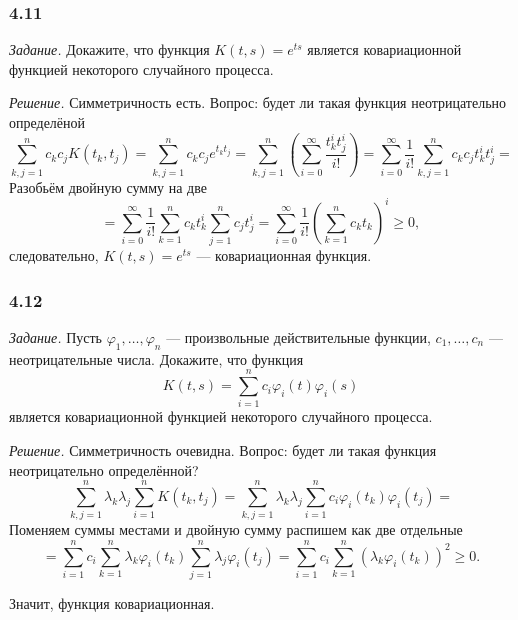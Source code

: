 \subsubsection*{4.11}

\textit{Задание.}
Докажите, что функция $K \left( t, s \right) = e^{ts}$
является ковариационной функцией некоторого случайного процесса.

\textit{Решение.}
Симметричность есть.
Вопрос: будет ли такая функция неотрицательно определёной
$$ \sum \limits_{k, j = 1}^n c_k c_j K \left( t_k, t_j \right) =
  \sum \limits_{k, j = 1}^n c_k c_j e^{t_k t_j} =
  \sum \limits_{k, j = 1}^n \left( \sum \limits_{i = 0}^{ \infty } \frac{t_k^i t_j^i}{i!} \right) =
  \sum \limits_{i = 0}^{ \infty } \frac{1}{i!} \sum \limits_{k, j = 1}^n c_k c_j t_k^i t_j^i =$$
Разобьём двойную сумму на две
$$= \sum \limits_{i = 0}^{ \infty } \frac{1}{i!} \sum \limits_{k = 1}^n c_k t_k^i
  \sum \limits_{j = 1}^n c_j t_j^i =
  \sum \limits_{i = 0}^{ \infty } \frac{1}{i!} \left( \sum \limits_{k = 1}^n c_k t_k \right)^i \geq
  0,$$
следовательно, $K \left( t, s \right) = e^{ts}$ --- ковариационная функция.

\subsubsection*{4.12}

\textit{Задание.}
Пусть $ \varphi_1, \dotsc, \varphi_n$ --- произвольные действительные функции,
$c_1, \dotsc, c_n$ --- неотрицательные числа.
Докажите, что функция
$$K \left( t, s \right) =
  \sum \limits_{i = 1}^n c_i \varphi_i \left( t \right) \varphi_i \left( s \right) $$
является ковариационной функцией некоторого случайного процесса.

\textit{Решение.}
Симметричность очевидна.
Вопрос: будет ли такая функция неотрицательно определённой?
$$ \sum \limits_{k, j = 1}^n \lambda_k \lambda_j \sum \limits_{i = 1}^n K \left( t_k, t_j \right) =
  \sum \limits_{k, j = 1}^n \lambda_k \lambda_j
  \sum \limits_{i = 1}^n c_i \varphi_i \left( t_k \right) \varphi_i \left( t_j \right) =$$
Поменяем суммы местами и двойную сумму распишем как две отдельные
$$= \sum \limits_{i = 1}^n c_i \sum \limits_{k = 1}^n \lambda_k \varphi_i \left( t_k \right)
  \sum \limits_{j = 1}^n \lambda_j \varphi_i \left( t_j \right) =
  \sum \limits_{i = 1}^n c_i
    \sum \limits_{k = 1}^n \left( \lambda_k \varphi_i \left( t_k \right) \right)^2 \geq
  0.$$

Значит, функция ковариационная.
